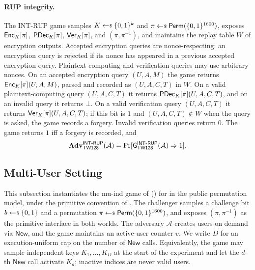 \paragraph{RUP integrity.}
The \textsf{INT-RUP} game samples $K \sample \bits^k$ and
$\pi \sample \Perm(\bits^{1600})$, exposes $\mathsf{Enc}_K[\pi]$,
$\mathsf{PDec}_K[\pi]$, $\mathsf{Ver}_K[\pi]$, and $(\pi, \pi^{-1})$, and maintains the replay
table $W$ of encryption outputs. Accepted encryption queries are
nonce-respecting: an encryption query is rejected if its nonce has appeared in a
previous accepted encryption query. Plaintext-computing and verification
queries may use arbitrary nonces. On an accepted encryption query $(U, A, M)$ the
game returns $\mathsf{Enc}_K[\pi](U, A, M)$, parsed and recorded as $(U, A, C, T)$ in $W$.
On a valid plaintext-computing query $(U, A, C, T)$ it returns
$\mathsf{PDec}_K[\pi](U, A, C, T)$, and on an invalid query it returns $\bot$. On a valid
verification query $(U, A, C, T)$ it returns $\mathsf{Ver}_K[\pi](U, A, C, T)$; if this bit
is $1$ and $(U, A, C, T) \notin W$ when the query is asked, the game records a
forgery. Invalid verification queries return $0$. The game returns $1$ iff a
forgery is recorded, and
\[
  \mathbf{Adv}^{\mathsf{INT\text{-}RUP}}_{\textsf{TW128}}(\mathcal{A}) =
  \Pr[\mathsf{G}^{\mathsf{INT\text{-}RUP}}_{\textsf{TW128}}(\mathcal{A}) \Rightarrow 1].
\]

\subsection{Multi-User Setting}
\label{sec:mu-setting}

This subsection instantiates the mu-ind game of \cite{BT16}
() for \TW{} in the public permutation model, under
the primitive convention of . The challenger
samples a challenge bit $b \sample \bits$ and a permutation
$\pi \sample \Perm(\bits^{1600})$, and exposes $(\pi, \pi^{-1})$ as the
primitive interface in both worlds. The
adversary $\mathcal{A}$ creates users on demand via $\mathsf{New}$, and
the game maintains an active-user counter $v$. We write $D$ for an
execution-uniform cap on the number of $\mathsf{New}$ calls. Equivalently,
the game may sample independent keys $K_1,\dots,K_D$ at the start of the
experiment and let the $d$-th $\mathsf{New}$ call activate $K_d$; inactive
indices are never valid users.

